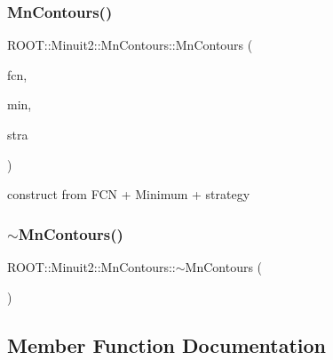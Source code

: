 \subsubsection{\texorpdfstring{MnContours()}{MnContours()}\hspace{0.1cm}{\footnotesize\ttfamily [6/6]}}
{\footnotesize\ttfamily R\+O\+O\+T\+::\+Minuit2\+::\+Mn\+Contours\+::\+Mn\+Contours (\begin{DoxyParamCaption}\item[{const \mbox{\hyperlink{classROOT_1_1Minuit2_1_1FCNBase}{F\+C\+N\+Base}} \&}]{fcn,  }\item[{const \mbox{\hyperlink{classROOT_1_1Minuit2_1_1FunctionMinimum}{Function\+Minimum}} \&}]{min,  }\item[{const \mbox{\hyperlink{classROOT_1_1Minuit2_1_1MnStrategy}{Mn\+Strategy}} \&}]{stra }\end{DoxyParamCaption})\hspace{0.3cm}{\ttfamily [inline]}}



construct from F\+CN + Minimum + strategy 

\mbox{\label{classROOT_1_1Minuit2_1_1MnContours_a0764759095adb2129ae9282024af472a}} 
\subsubsection{\texorpdfstring{$\sim$MnContours()}{~MnContours()}\hspace{0.1cm}{\footnotesize\ttfamily [2/2]}}
{\footnotesize\ttfamily R\+O\+O\+T\+::\+Minuit2\+::\+Mn\+Contours\+::$\sim$\+Mn\+Contours (\begin{DoxyParamCaption}{ }\end{DoxyParamCaption})\hspace{0.3cm}{\ttfamily [inline]}}



\subsection{Member Function Documentation}
\mbox{\label{classROOT_1_1Minuit2_1_1MnContours_a8bcd5be6a72acc39c1b56fd45e9958ba}} 

